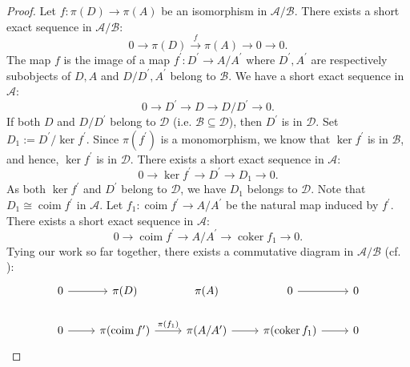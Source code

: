 \documentclass[11pt]{amsart}
\theoremstyle{plain}
\theoremstyle{definition}
\numberwithin{equation}{section}
\numberwithin{theorem}{section}
\begin{document}
\begin{proof}
    Let $f \colon \pi(D) \to \pi(A)$ be an isomorphism in $\mathcal{A}/\mathcal{B}$. There exists a short exact sequence in $\mathcal{A}/\mathcal{B}$:
    \begin{displaymath}
        0 \to \pi(D) \xrightarrow{f} \pi(A) \to 0 \to 0.
    \end{displaymath}
    The map $f$ is the image of a map $f^\prime \colon D^\prime \to A/A^\prime$ where $D^\prime, A^\prime$ are respectively subobjects of $D,A$ and $D/D^\prime, A^\prime$ belong to $\mathcal{B}$. We have a short exact sequence in $\mathcal{A}$:
    \begin{displaymath}
        0 \to D^\prime \to D \to D/D^\prime \to 0.
    \end{displaymath}
    If both $D$ and $D/D^\prime$ belong to $\mathcal{D}$ (i.e. $\mathcal{B}\subseteq \mathcal{D}$), then $D^\prime$ is in $\mathcal{D}$. Set $D_1 := D^\prime / \ker f^\prime$. Since $\pi(f^\prime)$ is a monomorphism, we know that $\ker f^\prime$ is in $\mathcal{B}$, and hence, $\ker f^\prime$ is in $\mathcal{D}$. There exists a short exact sequence in $\mathcal{A}$:
    \begin{displaymath}
        0 \to \ker f^\prime \to D^\prime \to D_1 \to 0.
    \end{displaymath}
    As both $\ker f^\prime$ and $D^\prime$ belong to $\mathcal{D}$, we have $D_1$ belongs to $\mathcal{D}$. Note that $D_1 \cong \operatorname{coim} f^\prime$ in $\mathcal{A}$. Let $f_1 \colon \operatorname{coim} f^\prime \to A/A^\prime$ be the natural map induced by $f^\prime$. There exists a short exact sequence in $\mathcal{A}$:
    \begin{displaymath}
        0 \to \operatorname{coim}f^\prime \to A/A^\prime \to \operatorname{coker} f_1 \to 0.
    \end{displaymath}
    Tying our work so far together, there exists a commutative diagram in $\mathcal{A}/\mathcal{B}$ (cf. \cite[$\S 3.1$ Corollaire 1]{Gabriel:1962}):
    \begin{displaymath}
        \begin{tikzcd}
            0 & {\pi(D)} & {\pi(A)} & 0 & 0 \\
            0 & {\pi(\operatorname{coim} f^\prime)} & {\pi(A/A^\prime)} & {\pi(\operatorname{coker} f_1)} & 0
            \arrow[from=1-1, to=1-2]
            \arrow[from=1-4, to=1-5]
            \arrow[from=2-1, to=2-2]
            \arrow["{\pi(f_1)}", from=2-2, to=2-3]
            \arrow[from=2-3, to=2-4]
            \arrow[from=2-4, to=2-5]

\end{tikzcd}
\end{displaymath}
\end{proof}
\end{document}
